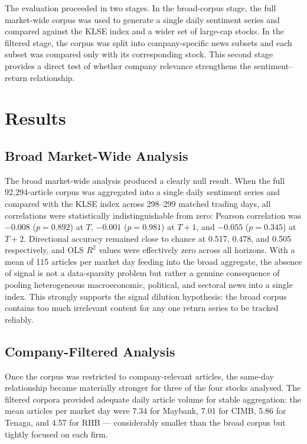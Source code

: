 \documentclass[12pt]{ucetd}
\begin{document}
The evaluation proceeded in two stages. In the broad-corpus stage, the full market-wide corpus was used to generate a single daily sentiment series and compared against the KLSE index and a wider set of large-cap stocks. In the filtered stage, the corpus was split into company-specific news subsets and each subset was compared only with its corresponding stock. This second stage provides a direct test of whether company relevance strengthens the sentiment--return relationship.
\section{Results}

\subsection{Broad Market-Wide Analysis}

The broad market-wide analysis produced a clearly null result. When the full 92,294-article corpus was aggregated into a single daily sentiment series and compared with the KLSE index across 298--299 matched trading days, all correlations were statistically indistinguishable from zero: Pearson correlation was $-0.008$ ($p = 0.892$) at $T$, $-0.001$ ($p = 0.981$) at $T{+}1$, and $-0.055$ ($p = 0.345$) at $T{+}2$. Directional accuracy remained close to chance at 0.517, 0.478, and 0.505 respectively, and OLS $R^2$ values were effectively zero across all horizons. With a mean of 115 articles per market day feeding into the broad aggregate, the absence of signal is not a data-sparsity problem but rather a genuine consequence of pooling heterogeneous macroeconomic, political, and sectoral news into a single index. This strongly supports the signal dilution hypothesis: the broad corpus contains too much irrelevant content for any one return series to be tracked reliably.

\subsection{Company-Filtered Analysis}

Once the corpus was restricted to company-relevant articles, the same-day relationship became materially stronger for three of the four stocks analysed. The filtered corpora provided adequate daily article volume for stable aggregation: the mean articles per market day were 7.34 for Maybank, 7.01 for CIMB, 5.86 for Tenaga, and 4.57 for RHB --- considerably smaller than the broad corpus but tightly focused on each firm.
\end{document}
